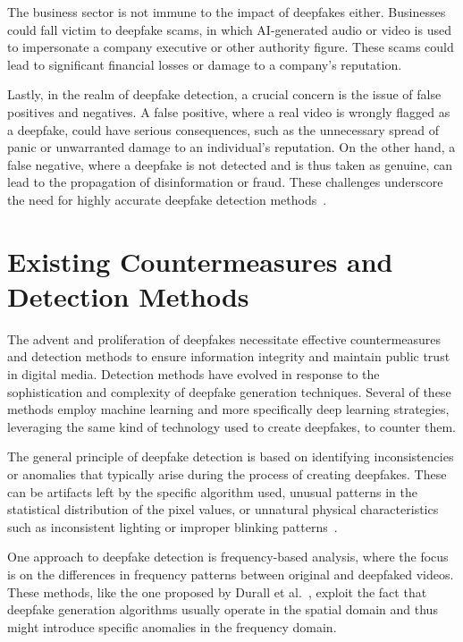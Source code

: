 The business sector is not immune to the impact of deepfakes either. Businesses
could fall victim to deepfake scams, in which \ac{AI}-generated audio or video
is used to impersonate a company executive or other authority figure.
These scams could lead to significant financial losses or damage to a
company's reputation.

Lastly, in the realm of deepfake detection, a crucial concern is the issue of
false positives and negatives. A false positive, where a real video is wrongly
flagged as a deepfake, could have serious consequences, such as the unnecessary
spread of panic or unwarranted damage to an individual's reputation. On the
other hand, a false negative, where a deepfake is not detected and is thus
taken as genuine, can lead to the propagation of disinformation or fraud.
These challenges underscore the need for highly accurate deepfake detection methods~\cite{rössler2019faceforensics}.

\section{Existing Countermeasures and Detection Methods}\label{chapter:countermeasures}
The advent and proliferation of deepfakes necessitate effective countermeasures
and detection methods to ensure information integrity and maintain public trust
in digital media. Detection methods have evolved in response to the sophistication
and complexity of deepfake generation techniques. Several of these methods employ
machine learning and more specifically deep learning strategies, leveraging the
same kind of technology used to create deepfakes, to counter them.

The general principle of deepfake detection is based on identifying inconsistencies
or anomalies that typically arise during the process of creating deepfakes. These
can be artifacts left by the specific algorithm used, unusual patterns in the
statistical distribution of the pixel values, or unnatural physical characteristics
such as inconsistent lighting or improper blinking patterns~\cite{Agarwal_2019_CVPR_Workshops}.

One approach to deepfake detection is frequency-based analysis, where the focus is
on the differences in frequency patterns between original and deepfaked videos.
These methods, like the one proposed by Durall et al.~\cite{durall2020unmasking},
exploit the fact that deepfake generation algorithms usually operate in the
spatial domain and thus might introduce specific anomalies in the frequency domain.

